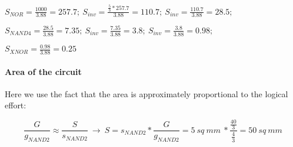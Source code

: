 \documentclass[12pt]{article}
\begin{document}
$S_{NOR} = \frac{1000}{3.88} = 257.7; \ S_{inv} = \frac{\frac{5}{3}*257.7}{3.88} = 110.7; \ S_{inv} = \frac{110.7}{3.88} = 28.5;$

$S_{NAND4} = \frac{28.5}{3.88} = 7.35; \ S_{inv} = \frac{7.35}{3.88} = 3.8; \ S_{inv} = \frac{3.8}{3.88} = 0.98;$

$S_{XNOR} = \frac{0.98}{3.88} = 0.25$

\paragraph{Area of the circuit}

Here we use the fact that the area is approximately proportional to the logical effort:

$$\frac{G}{g_{NAND2}} \approx \frac{S}{s_{NAND2}} \ \rightarrow \ S = s_{NAND2}*\frac{G}{g_{NAND2}} = 5 \ sq \ mm \ * \frac{\frac{40}{3}}{\frac{4}{3}} = 50 \ sq \ mm$$
\end{document}

